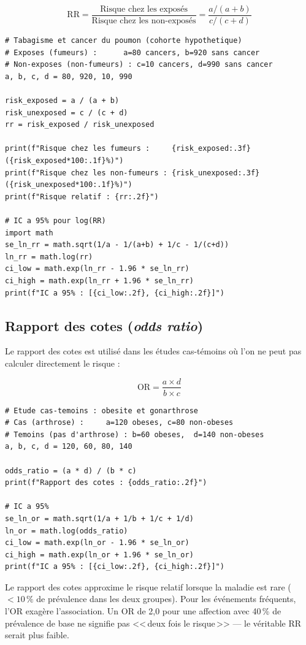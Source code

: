 \[
\text{RR} = \frac{\text{Risque chez les expos\'es}}{\text{Risque chez les non-expos\'es}} = \frac{a/(a+b)}{c/(c+d)}
\]

\begin{verbatim}
# Tabagisme et cancer du poumon (cohorte hypothetique)
# Exposes (fumeurs) :      a=80 cancers, b=920 sans cancer
# Non-exposes (non-fumeurs) : c=10 cancers, d=990 sans cancer
a, b, c, d = 80, 920, 10, 990

risk_exposed = a / (a + b)
risk_unexposed = c / (c + d)
rr = risk_exposed / risk_unexposed

print(f"Risque chez les fumeurs :     {risk_exposed:.3f} ({risk_exposed*100:.1f}%)")
print(f"Risque chez les non-fumeurs : {risk_unexposed:.3f} ({risk_unexposed*100:.1f}%)")
print(f"Risque relatif : {rr:.2f}")

# IC a 95% pour log(RR)
import math
se_ln_rr = math.sqrt(1/a - 1/(a+b) + 1/c - 1/(c+d))
ln_rr = math.log(rr)
ci_low = math.exp(ln_rr - 1.96 * se_ln_rr)
ci_high = math.exp(ln_rr + 1.96 * se_ln_rr)
print(f"IC a 95% : [{ci_low:.2f}, {ci_high:.2f}]")
\end{verbatim}

\subsection{Rapport des cotes (\emph{odds ratio})}

Le rapport des cotes est utilis\'e dans les \'etudes cas-t\'emoins o\`u l'on ne peut pas calculer directement le risque :

\[
\text{OR} = \frac{a \times d}{b \times c}
\]

\begin{verbatim}
# Etude cas-temoins : obesite et gonarthrose
# Cas (arthrose) :     a=120 obeses, c=80 non-obeses
# Temoins (pas d'arthrose) : b=60 obeses,  d=140 non-obeses
a, b, c, d = 120, 60, 80, 140

odds_ratio = (a * d) / (b * c)
print(f"Rapport des cotes : {odds_ratio:.2f}")

# IC a 95%
se_ln_or = math.sqrt(1/a + 1/b + 1/c + 1/d)
ln_or = math.log(odds_ratio)
ci_low = math.exp(ln_or - 1.96 * se_ln_or)
ci_high = math.exp(ln_or + 1.96 * se_ln_or)
print(f"IC a 95% : [{ci_low:.2f}, {ci_high:.2f}]")
\end{verbatim}

\begin{clinicalnote}
Le rapport des cotes approxime le risque relatif lorsque la maladie est rare ($<10\,\%$ de pr\'evalence dans les deux groupes). Pour les \'ev\'enements fr\'equents, l'OR exag\`ere l'association. Un OR de 2,0 pour une affection avec 40\,\% de pr\'evalence de base ne signifie pas <<\,deux fois le risque\,>> --- le v\'eritable RR serait plus faible.
\end{clinicalnote}

